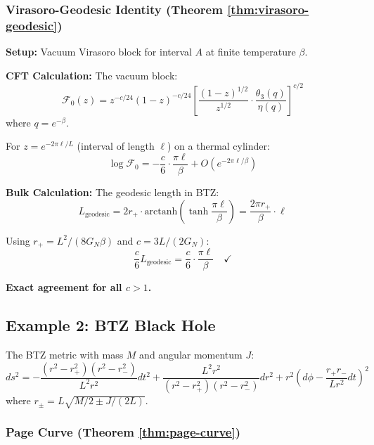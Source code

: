 \documentclass[12pt,a4paper]{article}
\begin{document}
\subsubsection{Virasoro-Geodesic Identity (Theorem \ref{thm:virasoro-geodesic})}

\textbf{Setup:} Vacuum Virasoro block for interval $A$ at finite temperature $\beta$.

\textbf{CFT Calculation:}
The vacuum block:
\begin{equation}
\mathcal{F}_0(z) = z^{-c/24} (1-z)^{-c/24} \left[ \frac{(1-z)^{1/2}}{z^{1/2}} \cdot \frac{\theta_3(q)}{\eta(q)} \right]^{c/2}
\end{equation}
where $q = e^{-\beta}$.

For $z = e^{-2\pi \ell/L}$ (interval of length $\ell$) on a thermal cylinder:
\begin{equation}
\log \mathcal{F}_0 = -\frac{c}{6} \cdot \frac{\pi \ell}{\beta} + O(e^{-2\pi\ell/\beta})
\end{equation}

\textbf{Bulk Calculation:}
The geodesic length in BTZ:
\begin{equation}
L_{\text{geodesic}} = 2r_+ \cdot \text{arctanh}\left( \tanh\frac{\pi\ell}{\beta} \right) = \frac{2\pi r_+}{\beta} \cdot \ell
\end{equation}

Using $r_+ = L^2/(8G_N \beta)$ and $c = 3L/(2G_N)$:
\begin{equation}
\frac{c}{6} L_{\text{geodesic}} = \frac{c}{6} \cdot \frac{\pi\ell}{\beta} \quad \checkmark
\end{equation}

\textbf{Exact agreement for all $c > 1$.}

\subsection{Example 2: BTZ Black Hole}

The BTZ metric with mass $M$ and angular momentum $J$:
\begin{equation}
ds^2 = -\frac{(r^2 - r_+^2)(r^2 - r_-^2)}{L^2 r^2} dt^2 + \frac{L^2 r^2}{(r^2 - r_+^2)(r^2 - r_-^2)} dr^2 + r^2 \left( d\phi - \frac{r_+ r_-}{L r^2} dt \right)^2
\end{equation}
where $r_\pm = L\sqrt{M/2 \pm J/(2L)}$.

\subsubsection{Page Curve (Theorem \ref{thm:page-curve})}
\end{document}
